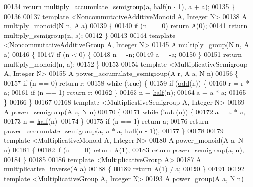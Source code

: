 \begin{DoxyCode}
00134   \textcolor{keywordflow}{return} multiply\_accumulate\_semigroup(a, \mbox{\hyperlink{ch07_8hpp_a5c310c077a590421ce629a0a40d6b841}{half}}(n - 1), a + a);
00135 \}
00136 
00137 \textcolor{keyword}{template} <NoncommutativeAdditiveMono\textcolor{keywordtype}{id} A, Integer N>
00138 A multiply\_monoid(N n, A a)
00139 \{
00140   \textcolor{keywordflow}{if} (n == 0) \textcolor{keywordflow}{return} A(0);
00141   \textcolor{keywordflow}{return} multiply\_semigroup(n, a);
00142 \}
00143 
00144 \textcolor{keyword}{template} <NoncommutativeAdditiveGroup A, Integer N>
00145 A multiply\_group(N n, A a)
00146 \{
00147   \textcolor{keywordflow}{if} (n < 0) \{
00148     n = -n;
00149     a = -a;
00150   \}
00151   \textcolor{keywordflow}{return} multiply\_monoid(n, a);
00152 \}
00153 
00154 \textcolor{keyword}{template} <MultiplicativeSemigroup A, Integer N>
00155 A power\_accumulate\_semigroup(A r, A a, N n)
00156 \{
00157   \textcolor{keywordflow}{if} (n == 0) \textcolor{keywordflow}{return} r;
00158   \textcolor{keywordflow}{while} (\textcolor{keyword}{true}) \{
00159     \textcolor{keywordflow}{if} (\mbox{\hyperlink{ch07_8hpp_a77588a29d6eeebc52834d05039b7f83f}{odd}}(n)) \{
00160       r = r * a;
00161       \textcolor{keywordflow}{if} (n == 1) \textcolor{keywordflow}{return} r;
00162     \}
00163     n = \mbox{\hyperlink{ch07_8hpp_a5c310c077a590421ce629a0a40d6b841}{half}}(n);
00164     a = a * a;
00165   \}
00166 \}
00167 
00168 \textcolor{keyword}{template} <MultiplicativeSemigroup A, Integer N>
00169 A power\_semigroup(A a, N n)
00170 \{
00171   \textcolor{keywordflow}{while} (!\mbox{\hyperlink{ch07_8hpp_a77588a29d6eeebc52834d05039b7f83f}{odd}}(n)) \{
00172     a = a * a;
00173     n = \mbox{\hyperlink{ch07_8hpp_a5c310c077a590421ce629a0a40d6b841}{half}}(n);
00174   \}
00175   \textcolor{keywordflow}{if} (n == 1) \textcolor{keywordflow}{return} a;
00176   \textcolor{keywordflow}{return} power\_accumulate\_semigroup(a, a * a, \mbox{\hyperlink{ch07_8hpp_a5c310c077a590421ce629a0a40d6b841}{half}}(n - 1));
00177 \}
00178 
00179 \textcolor{keyword}{template} <MultiplicativeMono\textcolor{keywordtype}{id} A, Integer N>
00180 A power\_monoid(A a, N n)
00181 \{
00182   \textcolor{keywordflow}{if} (n == 0) \textcolor{keywordflow}{return} A(1);
00183   \textcolor{keywordflow}{return} power\_semigroup(a, n);
00184 \}
00185 
00186 \textcolor{keyword}{template} <MultiplicativeGroup A>
00187 A multiplicative\_inverse(A a)
00188 \{
00189   \textcolor{keywordflow}{return} A(1) / a;
00190 \}
00191 
00192 \textcolor{keyword}{template} <MultiplicativeGroup A, Integer N>
00193 A power\_group(A a, N n)

\end{DoxyCode}
